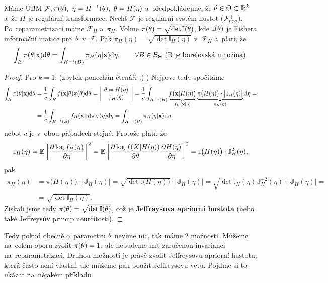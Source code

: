 \begin{theorem}[Jeffreys]
	Máme ÚBM $\mathcal{F},\pi(\theta),~\eta=H^{-1}(\theta),~\theta=H(\eta)$ a~předpokládejme, že $\theta\in\Theta\subset\mathbb{R}^k$ a~že $H$ je regulární transformace. Nechť $\mathcal{F}$ je regulární systém hustot ($\mathcal{F}_{reg}^+$). Po~reparametrizaci máme $\mathcal{F}_H$ a~$\pi_H$. Volme $\pi(\theta)=\sqrt{\det \mathbb{I}(\theta)}$, kde $\mathbb{I}(\theta)$ je Fishera informační matice pro~$\theta$ v~$\mathcal{F}$. Pak $\pi_H(\eta)=\sqrt{\det \mathbb{I}_H(\eta)}$ v~$\mathcal{F}_H$ a~platí, že 
	$$ \int_B\pi(\theta|\textbf{x})\mathrm{d}\theta=\int_{H^{-1}(B)}\pi_H(\eta|\textbf{x})\mathrm{d}\eta,\qquad\forall B\in\mathcal{B}_\Theta \text{ (B je borelovská množina).}$$
	\begin{proof}
		Pro $k=1$: (zbytek ponechán čtenáři ;) ) Nejprve tedy spočítáme
		\[
		\begin{split}
		\int_B\pi(\theta|\textbf{x})\mathrm{d}\theta&=\frac{1}{c}\int_B f(\textbf{x}|\theta)\pi(\theta)\mathrm{d}\theta=\left|\begin{array}{c}
		\theta=H(\eta)\\\mathbb{J}_H(\eta)
		\end{array}
		\right|=\frac{1}{c}\int_{H^{-1}(B)}\underbrace{f\big(\textbf{x}|H(\eta)\big)}_{f_H(\textbf{x}|\eta)}\underbrace{\pi\big(H(\eta)\big)\cdot\big|\mathbb{J}_H(\eta)\big|}_{\pi_H(\eta)}\mathrm{d}\eta=\\&=\frac{1}{c}\int_{H^{-1}(B)}f_H(\textbf{x}|\eta)\pi_H(\eta)\mathrm{d}\eta=\int_{H^{-1}(B)}\pi_H(\eta|\textbf{x})\mathrm{d}\eta,
		\end{split}
		\]
		neboť $c$ je v~obou případech stejné. Protože platí, že
		$$ \mathbb{I}_H(\eta)=\mathbb{E}\left[ \frac{\partial\log f_H(\eta)}{\partial\eta} \right]^2=\mathbb{E}\left[ \frac{\partial\log f(X|H(\eta))}{\partial\theta}\frac{\partial H(\eta)}{\partial\eta} \right]^2=\mathbb{I}\big(H(\eta)\big) \cdot \mathbb{J}_H^2(\eta) ,$$
		pak \[
		\begin{split}
		\pi_H(\eta)&=\pi\big(H(\eta)\big)\cdot\big|\mathbb{J}_H(\eta)\big|=\sqrt{\det \mathbb{I}\big(H(\eta)\big)}\cdot\big|\mathbb{J}_H(\eta)\big|=\sqrt{\det \mathbb{I}_H(\eta)\mathbb{J}_H^{-2}(\eta)}\cdot\big|\mathbb{J}_H(\eta)\big|=\\&=\sqrt{\det \mathbb{I}_H(\eta)}.
		\end{split}
		\]
		Získali jsme tedy $\pi(\theta)=\sqrt{\det \mathbb{I}(\theta)}$, což je \textbf{Jeffraysova apriorní hustota} (nebo také Jeffreysův princip neurčitosti).
	\end{proof}
\end{theorem}
Tedy pokud obecně o~parametru $\theta$ nevíme nic, tak máme 2 možnosti. Můžeme na~celém oboru zvolit $\pi(\theta)=1$, ale nebudeme mít zaručenou invarianci na~reparametrizaci. Druhou možností je právě zvolit Jeffreysovu apriorní hustotu, která často není vlastní, ale můžeme pak použít Jeffreysovu větu. Pojďme si to ukázat na~nějakém příkladu.
